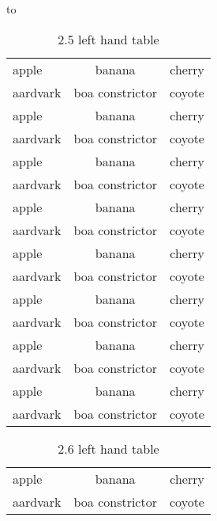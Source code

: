 \begin{sidewaystable}
    \setlength{\textwidth}{\theight}
    \setlength{\textheight}{\twidth}
    \caption{%
        2.4 sidewaystable mode
        {\tt\cbackslash halign\copencurly ...\cclosecurly\/} table%
    }
    \hbox to 
\end{sidewaystable}

\begin{table}
    \begin{tabular}{lcr}
        apple& banana& cherry\\
        aardvark& boa constrictor& coyote\\
        apple& banana& cherry\\
        aardvark& boa constrictor& coyote\\
        apple& banana& cherry\\
        aardvark& boa constrictor& coyote\\
        apple& banana& cherry\\
        aardvark& boa constrictor& coyote\\
        apple& banana& cherry\\
        aardvark& boa constrictor& coyote\\
        apple& banana& cherry\\
        aardvark& boa constrictor& coyote\\
        apple& banana& cherry\\
        aardvark& boa constrictor& coyote\\
        apple& banana& cherry\\
        aardvark& boa constrictor& coyote\\
    \end{tabular}
    \caption{2.5 left hand table}
\end{table}

\begin{table}
    \begin{tabular}{lcr}
        apple& banana& cherry\\
        aardvark& boa constrictor& coyote\\
    \end{tabular}
    \caption{2.6 left hand table}
\end{table}

